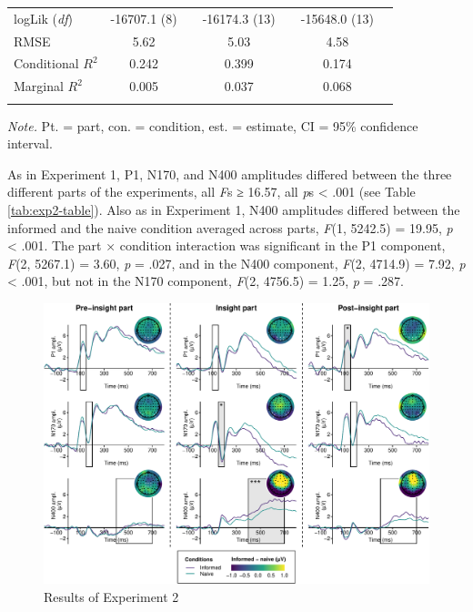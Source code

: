 \documentclass[
  english,
  doc,12pt,twoside,floatsintext]{apa7}
\begin{document}
\begin{table}[tbp]
\begin{center}
\begin{threeparttable}
{\begin{tabular}{lcccccc}
logLik (\textit{df}) & -16707.1 (8) &  & -16174.3 (13) &  & -15648.0 (13) & \\
RMSE & 5.62 &  & 5.03 &  & 4.58 & \\
Conditional $R^2$ & 0.242 &  & 0.399 &  & 0.174 & \\
Marginal $R^2$ & 0.005 &  & 0.037 &  & 0.068 & \\
\bottomrule
\addlinespace
\end{tabular}

}

\begin{tablenotes}[para]
\normalsize{\textit{Note.} Pt. = part, con. = condition, est. = estimate, CI = 95\% confidence interval.}
\end{tablenotes}

\end{threeparttable}
\end{center}

\end{table}

As in Experiment 1, P1, N170, and N400 amplitudes differed between the three different parts of the experiments, all \emph{F}s ≥ 16.57, all \emph{p}s \textless{} .001 (see Table \ref{tab:exp2-table}). Also as in Experiment 1, N400 amplitudes differed between the informed and the naive condition averaged across parts, \emph{F}(1, 5242.5) = 19.95, \emph{p} \textless{} .001. The part × condition interaction was significant in the P1 component, \emph{F}(2, 5267.1) = 3.60, \emph{p} = .027, and in the N400 component, \emph{F}(2, 4714.9) = 7.92, \emph{p} \textless{} .001, but not in the N170 component, \emph{F}(2, 4756.5) = 1.25, \emph{p} = .287.

\begin{figure}

{\centering \includegraphics[width=1\linewidth]{master_thesis_files/figure-latex/exp2-plot-1} 

}

\caption{Results of Experiment 2\smallskip}\label{fig:exp2-plot}
\end{figure}
\end{document}
